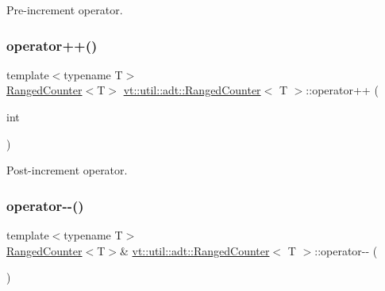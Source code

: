 Pre-\/increment operator. 

\mbox{\label{structvt_1_1util_1_1adt_1_1_ranged_counter_a38c5ea2a20d736897f2f4f76d211bdf8}} 
\subsubsection{\texorpdfstring{operator++()}{operator++()}\hspace{0.1cm}{\footnotesize\ttfamily [2/2]}}
{\footnotesize\ttfamily template$<$typename T$>$ \\
\hyperlink{structvt_1_1util_1_1adt_1_1_ranged_counter}{Ranged\+Counter}$<$T$>$ \hyperlink{structvt_1_1util_1_1adt_1_1_ranged_counter}{vt\+::util\+::adt\+::\+Ranged\+Counter}$<$ T $>$\+::operator++ (\begin{DoxyParamCaption}\item[{int}]{ }\end{DoxyParamCaption})\hspace{0.3cm}{\ttfamily [inline]}}



Post-\/increment operator. 

\mbox{\label{structvt_1_1util_1_1adt_1_1_ranged_counter_a2b63f02efaf2327c2dbc34b5c1472625}} 
\subsubsection{\texorpdfstring{operator-\/-\/()}{operator--()}\hspace{0.1cm}{\footnotesize\ttfamily [1/2]}}
{\footnotesize\ttfamily template$<$typename T$>$ \\
\hyperlink{structvt_1_1util_1_1adt_1_1_ranged_counter}{Ranged\+Counter}$<$T$>$\& \hyperlink{structvt_1_1util_1_1adt_1_1_ranged_counter}{vt\+::util\+::adt\+::\+Ranged\+Counter}$<$ T $>$\+::operator-\/-\/ (\begin{DoxyParamCaption}{ }\end{DoxyParamCaption})\hspace{0.3cm}{\ttfamily [inline]}}



